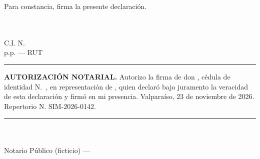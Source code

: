 \documentclass[11pt]{article}
\begin{document}
\noindent Para constancia, firma la presente declaración.

\vspace{12pt}
\begin{center}
  \SIMfirmalinea{7cm}{0.5pt}\\
  \textbf{\LFXrepresentante}\\
  C.I. N.\textdegree~\SIMrunrepresentante\\
  p.p. \LFXempresa{} --- RUT \LFXrut
\end{center}

\vspace{8pt}
\noindent\rule{\linewidth}{0.4pt}\par\smallskip
\noindent\begin{minipage}[b]{0.68\linewidth}\small
  \textbf{AUTORIZACIÓN NOTARIAL.} Autorizo la firma de don \textbf{\LFXrepresentante}, cédula de identidad N.\textdegree~\SIMrunrepresentante, en representación de \LFXempresa, quien declaró bajo juramento la veracidad de esta declaración y firmó en mi presencia. Valparaíso, 23 de noviembre de 2026. Repertorio N.\textdegree{} SIM-2026-0142.

  \vspace{14pt}
  \rule{6cm}{0.4pt}\\
  \SIMnotarioTitular\\ Notario Público (ficticio) --- \SIMnotaria\\ \SIMnotariaDir
\end{minipage}\hfill
\begin{minipage}[b]{3cm}\raggedleft\SIMtimbrenotarial[2.6cm]\end{minipage}
\end{document}
